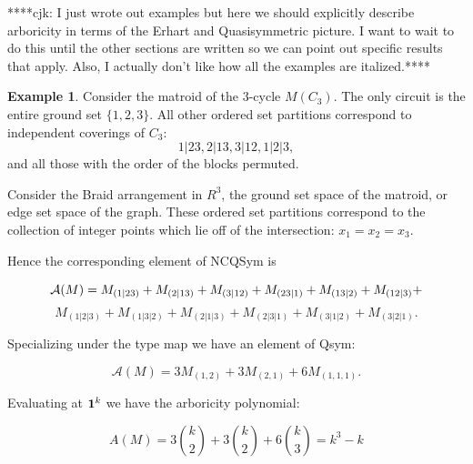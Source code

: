 \documentclass[12pt,reqno]{amsart}
\numberwithin{definition}{section}
\theoremstyle{definition}
\newtheorem{example}[definition]{Example}
\begin{document}



****cjk: I just wrote out examples but here we should explicitly describe arboricity in terms of the Erhart and Quasisymmetric picture.  I want to wait to do this until the other sections are written so we can point out specific results that apply.  Also, I actually don't like how all the examples are italized.****


\begin{example}

Consider the matroid of the $3$-cycle $M(C_3)$.  The only circuit is the entire ground set $\{1,2,3\}$.  All other ordered set partitions correspond to independent coverings of $C_3$: 
$$1|23, 2|13, 3|12, 1|2|3,$$
and all those with the order of the blocks permuted. 

Consider the Braid arrangement in $R^3$, the ground set space of the
matroid, or edge set space of the graph.  These ordered set partitions
correspond to the collection of integer points which lie off of the
intersection: $x_1 = x_2 = x_3$.


 Hence the corresponding element of NCQSym is 

$${\bf{{\mathcal A}}}(M) = M_{(1|23)} + M_{(2|13)} + M_{(3|12)} + M_{(23|1)} + M_{(13|2)} +  M_{(12|3)} + $$ $$ M_{(1|2|3)} + M_{(1|3|2)}
+ M_{(2|1|3)} + M_{(2|3|1)} + M_{(3|1|2)} + M_{(3|2|1)}. $$

\noindent Specializing under the type map we have an element of Qsym:

$${\mathcal A}(M) = 3 M_{(1,2)} + 3 M_{(2,1)} + 6 M_{(1,1,1)}. $$

\noindent Evaluating at ${\bf 1}^k $ we have the arboricity polynomial:

$$ A(M) = 3 { k \choose 2} + 3 { k \choose 2} + 6 { k \choose 3} = k^3 - k $$

\end{example}



 

 
\end{document}

